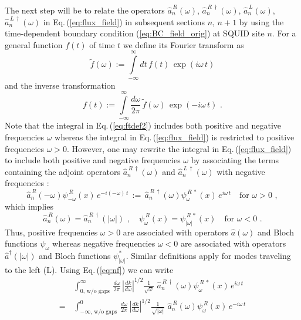 \noindent
The next step will be to relate the operators $\hat{a}_n^{\,R}(\omega)$, $\hat{a}_n^{\,R \, \dagger}(\omega)$,
$\hat{a}_n^{\,L}(\omega)$, $\hat{a}_n^{\,L \, \dagger}(\omega)$ in Eq.\,(\ref{eq:flux_field}) 
in subsequent sections $n$, $n+1$ by using 
the time-dependent boundary condition (\ref{eq:BC_field_orig}) at SQUID site $n$.  
For a general function $f(t)$ of time $t$ we define its Fourier transform as 
%
\begin{equation} \label{eq:ftdef1}
\widetilde{f}(\omega) := \int\limits_{-\infty}^{\infty} dt \, f(t) \, \exp(i \omega \, t) 
\end{equation}  
%
and the inverse transformation
%
\begin{equation} \label{eq:ftdef2}
f(t) := \int\limits_{-\infty}^{\infty} \frac{d\omega}{2 \pi} \, \widetilde{f}(\omega) \, \exp(- i \omega \, t) \, \, .
\end{equation}  
%
Note that the integral in Eq.\,(\ref{eq:ftdef2}) includes both positive and negative frequencies $\omega$
whereas the integral in Eq.\,(\ref{eq:flux_field}) is restricted to positive frequencies $\omega>0$. 
However, one may rewrite the integral in Eq.\,(\ref{eq:flux_field}) to include 
both positive and negative frequencies $\omega$ by associating the terms containing the 
adjoint operators $\hat{a}_n^{\,R \, \dagger}(\omega)$ and $\hat{a}_n^{\,L \, \dagger}(\omega)$ 
with negative frequencies \cite{Johansson2010}:
%
\begin{equation} \label{eq:nf}
\hat{a}_n^{\,R}(-\omega) \psi_{-\omega}^{\,R}(x) \, e^{- i (- \omega) \, t} \, := \,
\hat{a}_n^{\,R \, \dagger}(\omega) \psi_{\omega}^{\,R \, *}(x) \, e^{i \omega \, t} \quad
\text{for} \, \, \omega > 0 \, \, ,
\end{equation}
%
which implies
%
\begin{equation} \label{eq:nf2}
\hat{a}_n^{\,R}(\omega) = \hat{a}_n^{\,R\,\dagger}(|\omega|) \, \, , \quad 
\psi_{\omega}^{\,R}(x) = \psi_{|\omega|}^{\,R \, *}(x) \quad
\text{for} \, \, \omega < 0 \, \, .
\end{equation}
%
Thus, positive frequencies $\omega>0$ are associated with operators $\hat{a}(\omega)$
and Bloch functions $\psi_{\omega}$ whereas negative frequencies $\omega<0$ are associated with
operators $\hat{a}^{\dagger}(|\omega|)$ and Bloch functions $\psi_{|\omega|}^*$. 
Similar definitions apply for modes traveling to the left (L).
Using Eq.\,(\ref{eq:nf}) we can write
%
\begin{equation} \label{eq:ccterm}
\begin{split}
   & \int_{0, \, \text{w/o gaps}}^{\infty} \, \frac{d\omega}{2 \pi} \, \left| \frac{d k}{d \omega} \right|^{1/2}
    \frac{1}{\sqrt{\omega}} \, \, 
    \hat{a}_n^{\,R \, \dagger}(\omega) \psi_{\omega}^{\,R \, *}(x) \, e^{i \omega \, t} \\[4mm]
   = \, & \int_{-\infty, \, \text{w/o gaps}}^{0} \, \frac{d\omega}{2 \pi} \, \left| \frac{d k}{d \omega} \right|^{1/2}
    \frac{1}{\sqrt{|\omega|}} \, \, 
    \hat{a}_n^{\,R}(\omega) \psi_{\omega}^{\,R}(x) \, e^{- i \omega \, t}
\end{split}
\end{equation}
